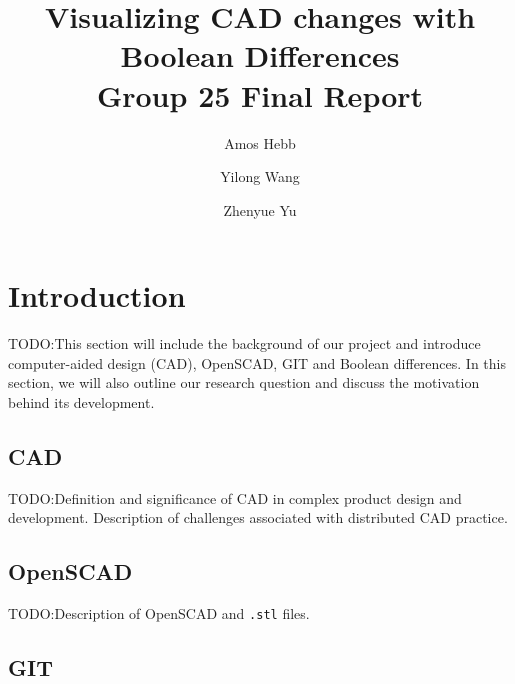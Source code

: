 \documentclass[sigconf,authorversion,nonacm]{acmart}
\begin{document}
\title[Visualizing CAD changes with Boolean Differences]
{Visualizing CAD changes with Boolean Differences\\
	\normalsize{Group 25 Final Report}}

\author{Amos Hebb}
\author{Yilong Wang}
\author{Zhenyue Yu}

\makeatletter
\def\@ACM@checkaffil{%
	\if@ACM@instpresent\else
		\ClassWarningNoLine{\@classname}{No institution present for an affiliation}%
	\fi
	\if@ACM@citypresent\else
		\ClassWarningNoLine{\@classname}{No city present for an affiliation}%
	\fi
	\if@ACM@countrypresent\else
		\ClassWarningNoLine{\@classname}{No country present for an affiliation}%
	\fi
}
\makeatother

\maketitle

\section{Introduction}

TODO:This section will include the background of our project and introduce computer-aided design (CAD), OpenSCAD, GIT and Boolean differences. In this section, we will also outline our research question and discuss the motivation behind its development.

\subsection{CAD}

TODO:Definition and significance of CAD in complex product design and development. Description of challenges associated with distributed CAD practice.

\subsection{OpenSCAD}

TODO:Description of OpenSCAD and \texttt{.stl} files.

\subsection{GIT}
\end{document}
